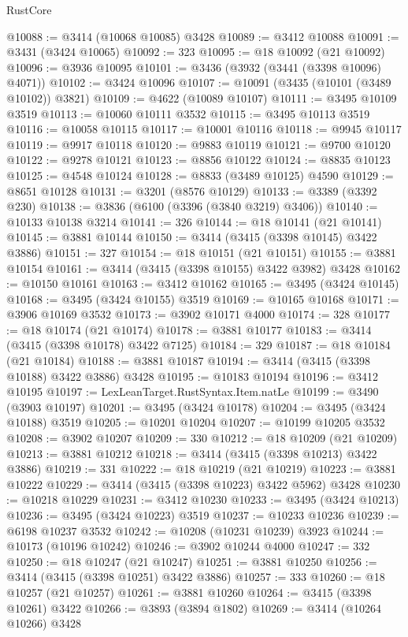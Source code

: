\begin{lexlean}{RustCore}
\begin{coremodule}
@10088 := @3414 (@10068 @10085) @3428
@10089 := @3412 @10088
@10091 := @3431 (@3424 @10065)
@10092 := 323
@10095 := @18 @10092 (@21 @10092)
@10096 := @3936 @10095
@10101 := @3436 (@3932 (@3441 (@3398 @10096) @4071))
@10102 := @3424 @10096
@10107 := @10091 (@3435 (@10101 (@3489 @10102)) @3821)
@10109 := @4622 (@10089 @10107)
@10111 := @3495 @10109 @3519
@10113 := @10060 @10111 @3532
@10115 := @3495 @10113 @3519
@10116 := @10058 @10115
@10117 := @10001 @10116
@10118 := @9945 @10117
@10119 := @9917 @10118
@10120 := @9883 @10119
@10121 := @9700 @10120
@10122 := @9278 @10121
@10123 := @8856 @10122
@10124 := @8835 @10123
@10125 := @4548 @10124
@10128 := @8833 (@3489 @10125) @4590
@10129 := @8651 @10128
@10131 := @3201 (@8576 @10129)
@10133 := @3389 (@3392 @230)
@10138 := @3836 (@6100 (@3396 (@3840 @3219) @3406))
@10140 := @10133 @10138 @3214
@10141 := 326
@10144 := @18 @10141 (@21 @10141)
@10145 := @3881 @10144
@10150 := @3414 (@3415 (@3398 @10145) @3422 @3886)
@10151 := 327
@10154 := @18 @10151 (@21 @10151)
@10155 := @3881 @10154
@10161 := @3414 (@3415 (@3398 @10155) @3422 @3982) @3428
@10162 := @10150 @10161
@10163 := @3412 @10162
@10165 := @3495 (@3424 @10145)
@10168 := @3495 (@3424 @10155) @3519
@10169 := @10165 @10168
@10171 := @3906 @10169 @3532
@10173 := @3902 @10171 @4000
@10174 := 328
@10177 := @18 @10174 (@21 @10174)
@10178 := @3881 @10177
@10183 := @3414 (@3415 (@3398 @10178) @3422 @7125)
@10184 := 329
@10187 := @18 @10184 (@21 @10184)
@10188 := @3881 @10187
@10194 := @3414 (@3415 (@3398 @10188) @3422 @3886) @3428
@10195 := @10183 @10194
@10196 := @3412 @10195
@10197 := LexLeanTarget.RustSyntax.Item.natLe
@10199 := @3490 (@3903 @10197)
@10201 := @3495 (@3424 @10178)
@10204 := @3495 (@3424 @10188) @3519
@10205 := @10201 @10204
@10207 := @10199 @10205 @3532
@10208 := @3902 @10207
@10209 := 330
@10212 := @18 @10209 (@21 @10209)
@10213 := @3881 @10212
@10218 := @3414 (@3415 (@3398 @10213) @3422 @3886)
@10219 := 331
@10222 := @18 @10219 (@21 @10219)
@10223 := @3881 @10222
@10229 := @3414 (@3415 (@3398 @10223) @3422 @5962) @3428
@10230 := @10218 @10229
@10231 := @3412 @10230
@10233 := @3495 (@3424 @10213)
@10236 := @3495 (@3424 @10223) @3519
@10237 := @10233 @10236
@10239 := @6198 @10237 @3532
@10242 := @10208 (@10231 @10239) @3923
@10244 := @10173 (@10196 @10242)
@10246 := @3902 @10244 @4000
@10247 := 332
@10250 := @18 @10247 (@21 @10247)
@10251 := @3881 @10250
@10256 := @3414 (@3415 (@3398 @10251) @3422 @3886)
@10257 := 333
@10260 := @18 @10257 (@21 @10257)
@10261 := @3881 @10260
@10264 := @3415 (@3398 @10261) @3422
@10266 := @3893 (@3894 @1802)
@10269 := @3414 (@10264 @10266) @3428

\end{coremodule}
\end{lexlean}
